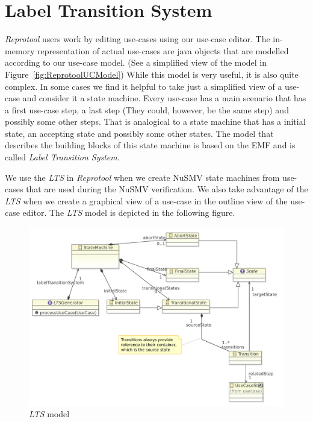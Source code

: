 \section{Label Transition System}

\emph{Reprotool} users work by editing use-cases using our use-case editor. The in-memory representation of actual use-cases are java
objects that are modelled according to our use-case model. (See a simplified view of the model in Figure~\ref{fig:ReprotoolUCModel})
While this model is very useful, it is also quite complex. In some cases we find it helpful to take just a simplified view of a
use-case and consider it a state machine. Every use-case has a main scenario that has a first use-case step, a last step (They could,
however, be the same step) and possibly some other steps. That is analogical to a state machine that has a initial state, an accepting
state and possibly some other states. The model that describes the building blocks of this state machine is based on the EMF and is
called \emph{Label Transition System}.

We use the \emph{LTS} in \emph{Reprotool} when we create NuSMV state machines from use-cases that are used during the NuSMV
verification. We also take advantage of the \emph{LTS} when we create a graphical view of a use-case in the outline view of the
use-case editor. The \emph{LTS} model is depicted in the following figure.

\begin{figure}[ht]
  \centering
  \includegraphics[width=450pt]{images/lts}
  \caption{\emph{LTS} model}
  \label{fig:ReprotoolLTSModel}
\end{figure}

